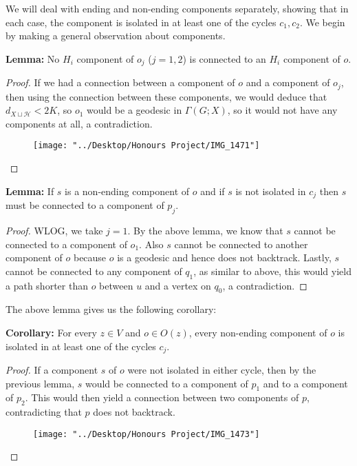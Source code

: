 \documentclass[12pt]{article}
\newcommand{\vs}{\vskip10pt}
\begin{document}
	\vs 
	
	We will deal with ending and non-ending components separately, showing that in each case, the component is isolated in at least one of the cycles $c_1, c_2$. We begin by making a general observation about components.
	
	\vs 
	
	\textbf{Lemma: } No $H_i$ component of $o_j$ ($j=1,2$) is connected to an $H_i$ component of $o$. 
	
	\begin{proof}
		
		If we had a connection between a component of $o$ and a component of $o_j$, then using the connection between these components, we would deduce that $d_{X \sqcup \mathcal{H}} < 2K$, so $o_1$ would be a geodesic in $\Gamma(G; X)$, so it would not have any components at all, a contradiction.
		
\begin{figure} [h]
	\centering
	\texttt{[image: "../Desktop/Honours Project/IMG\_1471"]}
	\caption{}
	\label{fig:img1471}
\end{figure}
		
	\end{proof}

	\textbf{Lemma: } If $s$ is a non-ending component of $o$ and if $s$ is not isolated in $c_j$ then $s$ must be connected to a component of $p_j$. 
	
	\begin{proof}
		
		WLOG, we take $j = 1$. By the above lemma, we know that $s$ cannot be connected to a component of $o_1$. Also $s$ cannot be connected to another component of $o$ because $o$ is a geodesic and hence does not backtrack. Lastly, $s$ cannot be connected to any component of $q_1$, as similar to above, this would yield a path shorter than $o$ between $u$ and a vertex on $q_0$, a contradiction.
		
	\end{proof}

	The above lemma gives us the following corollary: 
	
	\vs 
	
	\textbf{Corollary: } For every $z \in V$ and $o \in O(z)$, every non-ending component of $o$ is isolated in at least one of the cycles $c_j$. 
	
	\begin{proof}
		
		If a component $s$ of $o$ were not isolated in either cycle, then by the previous lemma, $s$ would be connected to a component of $p_1$ and to a component of $p_2$. This would then yield a connection between two components of $p$, contradicting that $p$ does not backtrack. 
		
\begin{figure} [h]
	\centering
	\texttt{[image: "../Desktop/Honours Project/IMG\_1473"]}
	\caption{}
	\label{fig:img1473}
\end{figure}
		
	\end{proof}
\end{document}
